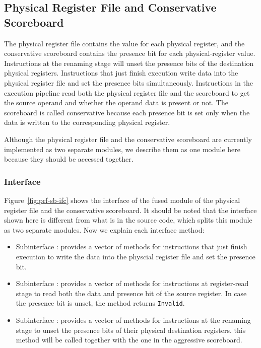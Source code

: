 \subsection{Physical Register File and Conservative Scoreboard}\label{sec:prf+sbcons}

The physical register file contains the value for each physical register, and the conservative scoreboard contains the presence bit for each physical-register value.
Instructions at the renaming stage will unset the presence bits of the destination physical registers.
Instructions that just finish execution write data into the physical register file and set the presence bits simultaneously.
Instructions in the execution pipeline read both the physical register file and the scoreboard to get the source operand and whether the operand data is present or not.
The scoreboard is called conservative because each presence bit is set only when the data is written to the corresponding physical register.

Although the physical register file and the conservative scoreboard are currently implemented as two separate modules, we describe them as one module here because they should be accessed together.

\subsubsection{Interface}
Figure~\ref{fig:prf-sb-ifc} shows the interface of the fused module of the physical register file and the conservative scoreboard.
It should be noted that the interface shown here is different from what is in the source code, which splits this module as two separate modules.
Now we explain each interface method:
\begin{itemize}
    \item Subinterface : provides a vector of methods for instructions that just finish execution to write the data into the physcial register file and set the presence bit.
    \item Subinterface : provides a vector of methods for instructions at register-read stage to read both the data and presence bit of the source register.
    In case the presence bit is unset, the method returns \texttt{Invalid}.
    \item Subinterface : provides a vector of methods for instructions at the renaming stage to unset the presence bits of their physical destination registers.
    this method will be called together with the one in the aggressive scoreboard.
\end{itemize}

